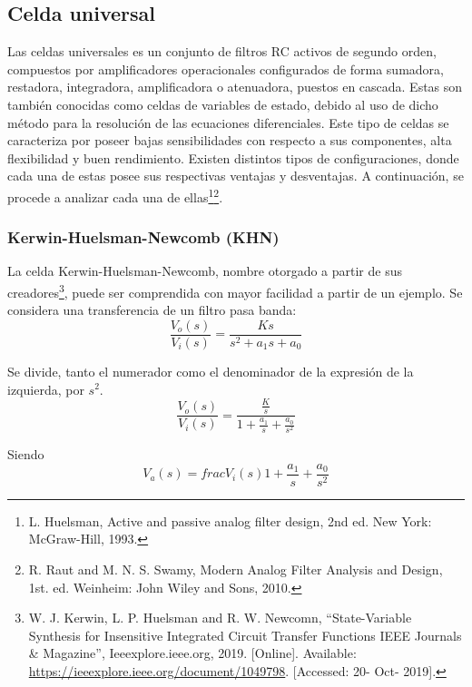 



\subsection{Celda universal}
Las celdas universales es un conjunto de filtros RC activos de segundo orden, compuestos por amplificadores operacionales configurados de forma sumadora, restadora, integradora, amplificadora o atenuadora, puestos en cascada. Estas son también conocidas como celdas de variables de estado, debido al uso de dicho método para la resolución de las ecuaciones diferenciales. Este tipo de celdas se caracteriza por poseer bajas sensibilidades con respecto a sus componentes, alta flexibilidad y buen rendimiento. Existen distintos tipos de configuraciones, donde cada una de estas posee sus respectivas ventajas y desventajas. A continuación, se procede a analizar cada una de ellas\footnote{L. Huelsman, Active and passive analog filter design, 2nd ed. New York: McGraw-Hill, 1993.}\footnote{R. Raut and M. N. S. Swamy, Modern Analog Filter Analysis and Design, 1st. ed. Weinheim: John Wiley and Sons, 2010.}.

\subsubsection{Kerwin-Huelsman-Newcomb (KHN)}
La celda Kerwin-Huelsman-Newcomb, nombre otorgado a partir de sus creadores\footnote{W. J. Kerwin, L. P. Huelsman and R. W. Newcomn, ``State-Variable Synthesis for Insensitive Integrated Circuit Transfer Functions  IEEE Journals \& Magazine'', Ieeexplore.ieee.org, 2019. [Online]. Available: \url{https://ieeexplore.ieee.org/document/1049798}. [Accessed: 20- Oct- 2019].}, puede ser comprendida con mayor facilidad a partir de un ejemplo. Se considera una transferencia de un filtro pasa banda:
\begin{equation}
	\frac{V_o(s)}{V_i(s)} = \frac{Ks}{s^2 + a_1 s + a_0}
\end{equation}

Se divide, tanto el numerador como el denominador de la expresión de la izquierda, por $s^2$.
\begin{equation}
	\frac{V_o(s)}{V_i(s)} = \frac{\frac{K}{s}}{1 + \frac{a_1}{s} + \frac{a_0}{s^2}}
	\label{equ:1}
\end{equation}

Siendo
\begin{equation}
	V_a(s) = frac{V_i(s)}{1 + \frac{a_1}{s} + \frac{a_0}{s^2}}
	\label{equ:2}
\end{equation}

